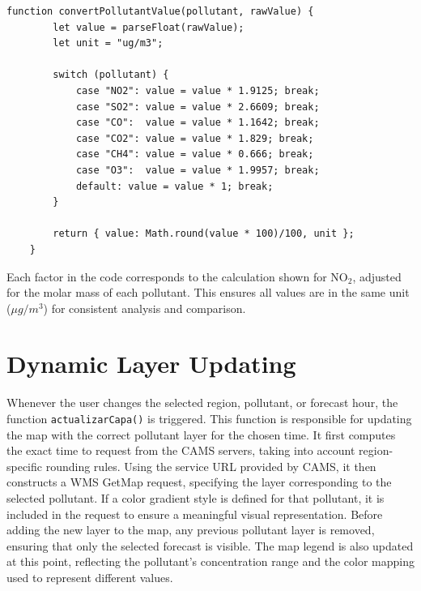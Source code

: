 \begin{lstlisting}[caption={Conversion of pollutant values to \(\mu g/m^3\)}]
	function convertPollutantValue(pollutant, rawValue) {
		let value = parseFloat(rawValue);
		let unit = "ug/m3"; 
		
		switch (pollutant) {
			case "NO2": value = value * 1.9125; break;
			case "SO2": value = value * 2.6609; break;
			case "CO":  value = value * 1.1642; break;
			case "CO2": value = value * 1.829; break;
			case "CH4": value = value * 0.666; break;
			case "O3":  value = value * 1.9957; break;
			default: value = value * 1; break;
		}
		
		return { value: Math.round(value * 100)/100, unit };
	}
\end{lstlisting}

Each factor in the code corresponds to the calculation shown for NO\(_2\), adjusted for the molar mass of each pollutant. This ensures all values are in the same unit (\(\mu g/m^3\)) for consistent analysis and comparison.

\section{Dynamic Layer Updating}

Whenever the user changes the selected region, pollutant, or forecast hour, the function \texttt{actualizarCapa()} is triggered. This function is responsible for updating the map with the correct pollutant layer for the chosen time. It first computes the exact time to request from the CAMS servers, taking into account region-specific rounding rules. Using the service URL provided by CAMS, it then constructs a WMS GetMap request, specifying the layer corresponding to the selected pollutant. If a color gradient style is defined for that pollutant, it is included in the request to ensure a meaningful visual representation. Before adding the new layer to the map, any previous pollutant layer is removed, ensuring that only the selected forecast is visible. The map legend is also updated at this point, reflecting the pollutant’s concentration range and the color mapping used to represent different values.


